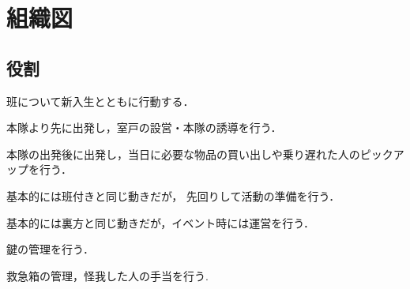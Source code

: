 \chapter{組織図}

\section{役割}
\begin{description}[labelwidth=6em]
  \item[班付き] 班について新入生とともに行動する．
  \item[先遣隊] 本隊より先に出発し，室戸の設営・本隊の誘導を行う．
  \item[後遣隊] 本隊の出発後に出発し，当日に必要な物品の買い出しや乗り遅れた人のピックアップを行う．
  \item[裏方] 基本的には班付きと同じ動きだが， 先回りして活動の準備を行う．
  \item[イベント運営] 基本的には裏方と同じ動きだが，イベント時には運営を行う．
  \item[鍵係] 鍵の管理を行う．
  \item[救護] 救急箱の管理，怪我した人の手当を行う.
\end{description}

